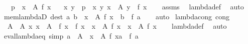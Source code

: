 \begin{isabellebody}
\ \ \ {\isachardoublequoteopen}p\ {\isasymin}\ {\isasymlambda}x\ {\isasymin}\ A{\isachardot}{\kern0pt}\ f\ x{\isachardoublequoteclose}\isanewline
\ \ \ x\ y\ \ {\isachardoublequoteopen}p\ {\isacharequal}{\kern0pt}\ {\isasymlangle}x{\isacharcomma}{\kern0pt}\ y{\isasymrangle}{\isachardoublequoteclose}\ {\isachardoublequoteopen}x\ {\isasymin}\ A{\isachardoublequoteclose}\ {\isachardoublequoteopen}y\ {\isacharequal}{\kern0pt}\ f\ x{\isachardoublequoteclose}\isanewline
%
\isadelimproof
\ \ %
\endisadelimproof
%
\isatagproof
{}\isamarkupfalse%
\ assms\ \isamarkupfalse%
\ lambda{\isacharunderscore}{\kern0pt}def\ \isamarkupfalse%
\ auto%
\endisatagproof
{\isafoldproof}%
%
\isadelimproof
\isanewline
%
\endisadelimproof
\isanewline
{}\isamarkupfalse%
\ mem{\isacharunderscore}{\kern0pt}lambdaD\ {\isacharbrackleft}{\kern0pt}dest{\isacharbrackright}{\kern0pt}{\isacharcolon}{\kern0pt}\ {\isachardoublequoteopen}{\isasymlangle}a{\isacharcomma}{\kern0pt}\ b{\isasymrangle}\ {\isasymin}\ {\isasymlambda}x\ {\isasymin}\ A{\isachardot}{\kern0pt}\ f\ x\ {\isasymLongrightarrow}\ b\ {\isacharequal}{\kern0pt}\ f\ a{\isachardoublequoteclose}\isanewline
%
\isadelimproof
\ \ %
\endisadelimproof
%
\isatagproof
{}\isamarkupfalse%
\ auto%
\endisatagproof
{\isafoldproof}%
%
\isadelimproof
\isanewline
%
\endisadelimproof
\isanewline
{}\isamarkupfalse%
\ lambda{\isacharunderscore}{\kern0pt}cong\ {\isacharbrackleft}{\kern0pt}cong{\isacharbrackright}{\kern0pt}{\isacharcolon}{\kern0pt}\isanewline
\ \ {\isachardoublequoteopen}{\isasymlbrakk}A\ {\isacharequal}{\kern0pt}\ A{\isacharprime}{\kern0pt}{\isacharsemicolon}{\kern0pt}\ {\isasymAnd}x{\isachardot}{\kern0pt}\ x\ {\isasymin}\ A\ {\isasymLongrightarrow}\ f\ x\ {\isacharequal}{\kern0pt}\ f{\isacharprime}{\kern0pt}\ x{\isasymrbrakk}\ {\isasymLongrightarrow}\ {\isacharparenleft}{\kern0pt}{\isasymlambda}x\ {\isasymin}\ A{\isachardot}{\kern0pt}\ f\ x{\isacharparenright}{\kern0pt}\ {\isacharequal}{\kern0pt}\ {\isasymlambda}x\ {\isasymin}\ A{\isacharprime}{\kern0pt}{\isachardot}{\kern0pt}\ f{\isacharprime}{\kern0pt}\ x{\isachardoublequoteclose}\isanewline
%
\isadelimproof
\ \ %
\endisadelimproof
%
\isatagproof
{}\isamarkupfalse%
\ lambda{\isacharunderscore}{\kern0pt}def\ \isamarkupfalse%
\ auto%
\endisatagproof
{\isafoldproof}%
%
\isadelimproof
\isanewline
%
\endisadelimproof
\isanewline
{}\isamarkupfalse%
\ eval{\isacharunderscore}{\kern0pt}lambda{\isacharunderscore}{\kern0pt}eq\ {\isacharbrackleft}{\kern0pt}simp{\isacharbrackright}{\kern0pt}{\isacharcolon}{\kern0pt}\ {\isachardoublequoteopen}a\ {\isasymin}\ A\ {\isasymLongrightarrow}\ {\isacharparenleft}{\kern0pt}{\isasymlambda}x\ {\isasymin}\ A{\isachardot}{\kern0pt}\ f\ x{\isacharparenright}{\kern0pt}{\isacharbackquote}{\kern0pt}a\ {\isacharequal}{\kern0pt}\ f\ a{\isachardoublequoteclose}\isanewline

\end{isabellebody}
